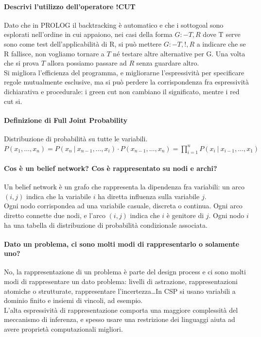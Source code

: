 \documentclass[10pt]{report}
\begin{document}
\paragraph{Descrivi l'utilizzo dell'operatore !CUT} Dato che in PROLOG il backtracking è automatico e che i sottogoal sono esplorati nell'ordine in cui appaiono, nei casi della forma $G :- T, R$ dove T serve sono come test dell'applicabilità di R, si può mettere $G :- T, !, R$ a indicare che se R fallisce, non vogliamo tornare a $T$ né testare altre alternative per G. Una volta che si prova $T$ allora possiamo passare ad $R$ senza guardare altro.\\Si migliora l'efficienza del programma, e migliorarne l'espressività per specificare regole mutualmente esclusive, ma si può perdere la corrispondenza fra espressività dichiarativa e procedurale: i green cut non cambiano il significato, mentre i red cut si.
\paragraph{Definizione di Full Joint Probability} Distribuzione di probabilità su tutte le variabili.\\
$P(x_1,\ldots,x_n) = P(x_n\:|\:x_{n-1},\ldots,x_i)\cdot P(x_{n-1},\ldots,x_n) = \prod_{i=1}^n P(x_i\:|\:x_{i-1},\ldots,x_1)$
\paragraph{Cos è un belief network? Cos è rappresentato su nodi e archi?} Un belief network è un grafo che rappresenta la dipendenza fra variabili: un arco $(i,j)$ indica che la variabile $i$ ha diretta influenza sulla variabile $j$.\\
Ogni nodo corrispondea ad una variabile casuale, discreta o continua. Ogni arco diretto connette due nodi, e l'arco $(i,j)$ indica che $i$ è genitore di $j$. Ogni nodo $i$ ha una tabella di distribuzione di probabilità condizionale associata.
\paragraph{Dato un problema, ci sono molti modi di rappresentarlo o solamente uno?} No, la rappresentazione di un problema è parte del design process e ci sono molti modi di rappresentare un dato problema: livelli di astrazione, rappresentazioni atomiche o strutturate, rappresentare l'incertezza\ldots In CSP si usano variabili a dominio finito e insiemi di vincoli, ad esempio.\\
L'alta espressività di rappresentazione comporta una maggiore complessità del meccanismo di inferenza, e spesso usare una restrizione dei linguaggi aiuta ad avere proprietà computazionali migliori.
\end{document}
